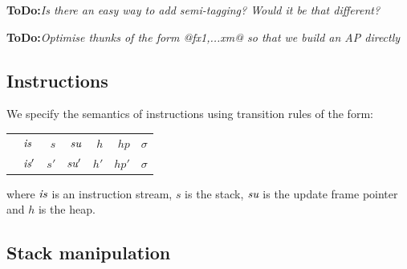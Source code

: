 \documentclass[11pt]{article}
\newcommand{\ToDo}[1]{{{\bf ToDo:}\sl #1}}
\newcommand{\Subsection}[2]{\subsection{#1}\label{sec:#2}}
\begin{document}
\ToDo{Is there an easy way to add semi-tagging?  Would it be that different?}

\ToDo{Optimise thunks of the form @f{x1,...xm}@ so that we build an AP directly}

\Subsection{Instructions}{hugs-instructions}

We specify the semantics of instructions using transition rules of
the form:

\begin{tabular}{|llrrrrr|}
\hline
	& $\mbox{\it is}$		& $s$ 	& $\mbox{\it su}$ 	& $h$  & $hp$  & $\sigma$ \\
\next	& $\mbox{\it is}'$	& $s'$ 	& $\mbox{\it su}'$	& $h'$ & $hp'$ & $\sigma$ \\
\hline
\end{tabular}

where $\mbox{\it is}$ is an instruction stream, $s$ is the stack, $\mbox{\it su}$ is the 
update frame pointer and $h$ is the heap.


\Subsection{Stack manipulation}{hugs-stack-manipulation}
\end{document}
